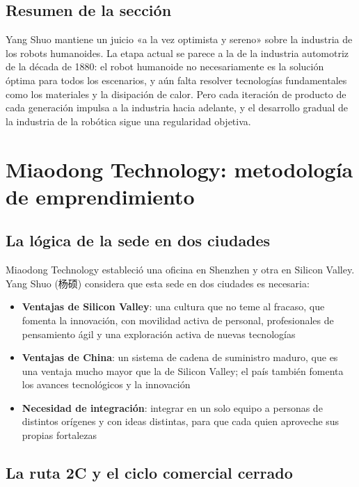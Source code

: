\documentclass[a4paper]{article}
\begin{document}
\subsection{Resumen de la sección}

Yang Shuo mantiene un juicio «a la vez optimista y sereno» sobre la industria de los robots humanoides. La etapa actual se parece a la de la industria automotriz de la década de 1880: el robot humanoide no necesariamente es la solución óptima para todos los escenarios, y aún falta resolver tecnologías fundamentales como los materiales y la disipación de calor. Pero cada iteración de producto de cada generación impulsa a la industria hacia adelante, y el desarrollo gradual de la industria de la robótica sigue una regularidad objetiva.
\section{Miaodong Technology: metodología de emprendimiento}

\subsection{La lógica de la sede en dos ciudades}

Miaodong Technology estableció una oficina en Shenzhen y otra en Silicon Valley. Yang Shuo (杨硕) considera que esta sede en dos ciudades es necesaria:

\begin{itemize}
    \item \textbf{Ventajas de Silicon Valley}: una cultura que no teme al fracaso, que fomenta la innovación, con movilidad activa de personal, profesionales de pensamiento ágil y una exploración activa de nuevas tecnologías
    \item \textbf{Ventajas de China}: un sistema de cadena de suministro maduro, que es una ventaja mucho mayor que la de Silicon Valley; el país también fomenta los avances tecnológicos y la innovación
    \item \textbf{Necesidad de integración}: integrar en un solo equipo a personas de distintos orígenes y con ideas distintas, para que cada quien aproveche sus propias fortalezas
\end{itemize}

\subsection{La ruta 2C y el ciclo comercial cerrado}
\end{document}
